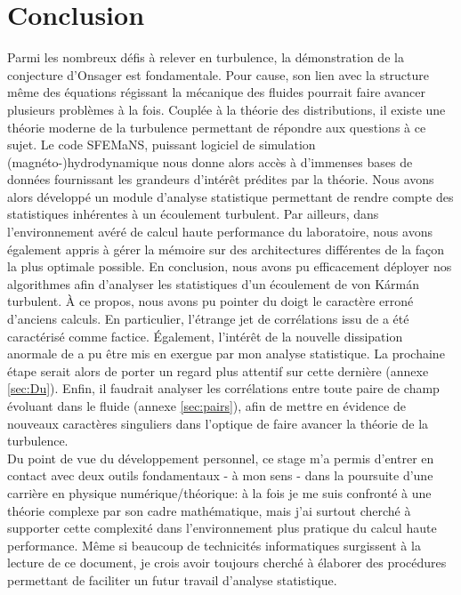 \documentclass[13pt, a4paper]{extarticle}
\begin{document}
\section{Conclusion}
\noindent Parmi les nombreux défis à relever en turbulence, la démonstration de la 
conjecture d'Onsager est fondamentale. Pour cause, son lien avec la structure 
même des équations régissant la mécanique des fluides pourrait faire avancer 
plusieurs problèmes à la fois. Couplée à la théorie des distributions, il existe 
une théorie moderne de la turbulence permettant de répondre aux questions à ce 
sujet. Le code SFEMaNS, puissant logiciel de simulation (magnéto-)hydrodynamique 
nous donne alors accès à d'immenses bases de données fournissant les grandeurs 
d'intérêt prédites par la théorie. Nous avons alors développé un module d'analyse 
statistique permettant de rendre compte des statistiques inhérentes à un écoulement 
turbulent. Par ailleurs, dans l'environnement avéré de calcul haute performance 
du laboratoire, nous avons également appris à gérer la mémoire sur des 
architectures différentes de la façon la plus optimale possible. En conclusion, 
nous avons pu efficacement déployer nos algorithmes afin d'analyser les statistiques 
d'un écoulement de von Kármán turbulent. À ce propos, nous avons pu pointer du doigt 
le caractère erroné d'anciens calculs. En particulier, l'étrange jet de corrélations
issu de \cite{Faller-Intermittency} a été caractérisé comme factice. Également, 
l'intérêt de la nouvelle dissipation anormale de \cite{Creff_2023} a pu être 
mis en exergue par mon analyse statistique. La prochaine étape serait alors de 
porter un regard plus attentif sur cette dernière (annexe \ref{sec:Du}). 
Enfin, il faudrait analyser les corrélations entre 
toute paire de champ évoluant dans le fluide (annexe \ref{sec:pairs}), 
afin de mettre en évidence de nouveaux 
caractères singuliers dans l'optique de faire avancer la théorie de la turbulence. \\
\noindent Du point de vue du développement personnel, ce stage m'a permis d'entrer en 
contact avec deux outils fondamentaux - à mon sens - dans la poursuite d'une carrière 
en physique numérique/théorique: à la fois je me suis confronté à une théorie complexe 
par son cadre mathématique, mais j'ai surtout cherché à supporter cette complexité dans 
l'environnement plus pratique du calcul haute performance. Même si beaucoup de technicités 
informatiques surgissent à la lecture de ce document, je crois avoir toujours cherché à 
élaborer des procédures permettant de faciliter un futur travail d'analyse statistique. 
\end{document}
